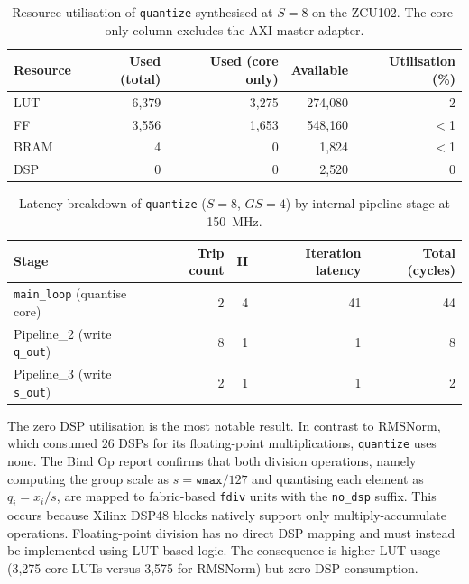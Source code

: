\begin{table}[H]
  \centering
  \begin{tabular}{lrrrr}
    \toprule
    Resource & Used (total) & Used (core only) & Available & Utilisation (\%) \\
    \midrule
    LUT  & 6{,}379 & 3{,}275 & 274{,}080 & 2 \\
    FF   & 3{,}556 & 1{,}653 & 548{,}160 & $<$1 \\
    BRAM & 4       & 0       & 1{,}824   & $<$1 \\
    DSP  & 0       & 0       & 2{,}520   & 0 \\
    \bottomrule
  \end{tabular}
  \caption{Resource utilisation of \texttt{quantize} synthesised at
           $S = 8$ on the ZCU102. The core-only column excludes the
           AXI master adapter.}
  \label{tab:quantize_resources}

\end{table}

\begin{table}[H]
  \centering
  \begin{tabular}{lrrrr}
    \toprule
    Stage & Trip count & II & Iteration latency & Total (cycles) \\
    \midrule
    \texttt{main\_loop} (quantise core) & 2 & 4  & 41 & 44 \\
    Pipeline\_2 (write \texttt{q\_out}) & 8 & 1  &  1 &  8 \\
    Pipeline\_3 (write \texttt{s\_out}) & 2 & 1  &  1 &  2 \\
    \bottomrule
  \end{tabular}
  \caption{Latency breakdown of \texttt{quantize} ($S = 8$, $GS = 4$)
           by internal pipeline stage at \SI{150}{\mega\hertz}.}
  \label{tab:quantize_latency}

\end{table}

The zero DSP utilisation is the most notable result. In contrast to
RMSNorm, which consumed 26 DSPs for its floating-point multiplications,
\texttt{quantize} uses none. The Bind Op report confirms that both
division operations, namely computing the group scale as $s =
\texttt{wmax}/127$ and quantising each element as $q_i = x_i / s$, are
mapped to fabric-based \texttt{fdiv} units with the \texttt{no\_dsp}
suffix. This occurs because Xilinx DSP48 blocks natively support only
multiply-accumulate operations. Floating-point division has no direct DSP
mapping and must instead be implemented using LUT-based logic. The
consequence is higher LUT usage (3{,}275 core LUTs versus 3{,}575 for
RMSNorm) but zero DSP consumption.

